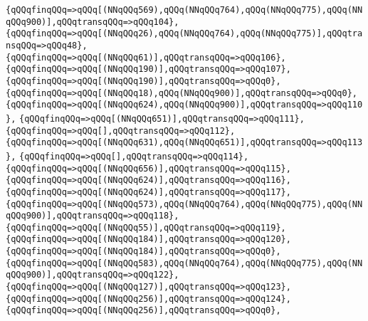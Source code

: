 \verb|{qQQqfinqQQq=>qQQq[(NNqQQq569),qQQq(NNqQQq764),qQQq(NNqQQq775),qQQq(NNqQQq900)],qQQqtransqQQq=>qQQq104},|\newline
\verb|{qQQqfinqQQq=>qQQq[(NNqQQq26),qQQq(NNqQQq764),qQQq(NNqQQq775)],qQQqtransqQQq=>qQQq48},|\newline
\verb|{qQQqfinqQQq=>qQQq[(NNqQQq61)],qQQqtransqQQq=>qQQq106},|\newline
\verb|{qQQqfinqQQq=>qQQq[(NNqQQq190)],qQQqtransqQQq=>qQQq107},|\newline
\verb|{qQQqfinqQQq=>qQQq[(NNqQQq190)],qQQqtransqQQq=>qQQq0},|\newline
\verb|{qQQqfinqQQq=>qQQq[(NNqQQq18),qQQq(NNqQQq900)],qQQqtransqQQq=>qQQq0},|\newline
\verb|{qQQqfinqQQq=>qQQq[(NNqQQq624),qQQq(NNqQQq900)],qQQqtransqQQq=>qQQq110},|\newline
\verb|{qQQqfinqQQq=>qQQq[(NNqQQq651)],qQQqtransqQQq=>qQQq111},|\newline
\verb|{qQQqfinqQQq=>qQQq[],qQQqtransqQQq=>qQQq112},|\newline
\verb|{qQQqfinqQQq=>qQQq[(NNqQQq631),qQQq(NNqQQq651)],qQQqtransqQQq=>qQQq113},|\newline
\verb|{qQQqfinqQQq=>qQQq[],qQQqtransqQQq=>qQQq114},|\newline
\verb|{qQQqfinqQQq=>qQQq[(NNqQQq656)],qQQqtransqQQq=>qQQq115},|\newline
\verb|{qQQqfinqQQq=>qQQq[(NNqQQq624)],qQQqtransqQQq=>qQQq116},|\newline
\verb|{qQQqfinqQQq=>qQQq[(NNqQQq624)],qQQqtransqQQq=>qQQq117},|\newline
\verb|{qQQqfinqQQq=>qQQq[(NNqQQq573),qQQq(NNqQQq764),qQQq(NNqQQq775),qQQq(NNqQQq900)],qQQqtransqQQq=>qQQq118},|\newline
\verb|{qQQqfinqQQq=>qQQq[(NNqQQq55)],qQQqtransqQQq=>qQQq119},|\newline
\verb|{qQQqfinqQQq=>qQQq[(NNqQQq184)],qQQqtransqQQq=>qQQq120},|\newline
\verb|{qQQqfinqQQq=>qQQq[(NNqQQq184)],qQQqtransqQQq=>qQQq0},|\newline
\verb|{qQQqfinqQQq=>qQQq[(NNqQQq583),qQQq(NNqQQq764),qQQq(NNqQQq775),qQQq(NNqQQq900)],qQQqtransqQQq=>qQQq122},|\newline
\verb|{qQQqfinqQQq=>qQQq[(NNqQQq127)],qQQqtransqQQq=>qQQq123},|\newline
\verb|{qQQqfinqQQq=>qQQq[(NNqQQq256)],qQQqtransqQQq=>qQQq124},|\newline
\verb|{qQQqfinqQQq=>qQQq[(NNqQQq256)],qQQqtransqQQq=>qQQq0},|\newline
